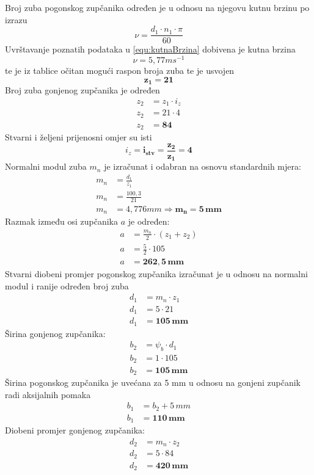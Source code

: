 \documentclass[11pt,a4paper]{report}
\begin{document}
Broj zuba pogonskog zupčanika određen je u odnosu na njegovu kutnu brzinu po izrazu
\begin{equation}
\nu=\frac{d_1 \cdot n_1 \cdot \pi}{60}\label{equ:kutnaBrzina}
\end{equation}
Uvrštavanje poznatih podataka u \eqref{equ:kutnaBrzina} dobivena je kutna brzina
$$\nu=5,77 ms^{-1}$$
te je iz tablice \cite{potrebniMaterijali} očitan mogući raspon broja zuba te je usvojen 
$$\mathbf{z_1=21}$$
Broj zuba gonjenog zupčanika je određen
\begin{align*}
z_2&=z_1 \cdot i_z\\
z_2&=21 \cdot 4\\
z_2&=\mathbf{84}
\end{align*}
Stvarni i željeni prijenosni omjer su isti $$i_z=\mathbf{i_{stv}=\frac{z_2}{z_1}=4}$$
Normalni modul zuba $m_n$ je izračunat i odabran na osnovu standardnih mjera:
\begin{align*}
m_n&=\frac{d_1}{z_1}\\
m_n&=\frac{100,3}{21}\\
m_n&=4,776 mm \Rightarrow \mathbf{m_n=5\, mm}
\end{align*}
Razmak između osi zupčanika $a$ je određen:
\begin{align*}
a&=\frac{m_n}{2} \cdot (z_1 + z_2)\\
a&=\frac{5}{2} \cdot 105\\
a&=\mathbf{262,5\,mm}
\end{align*}
Stvarni diobeni promjer pogonskog zupčanika izračunat je u odnosu na normalni modul i ranije određen broj zuba
\begin{align*}
d_1&=m_n \cdot z_1\\
d_1&=5 \cdot 21\\
d_1&=\mathbf{105 \, mm}
\end{align*}
Širina gonjenog zupčanika:
\begin{align*}
b_2&=\psi_b \cdot d_1\\
b_2&=1 \cdot 105\\
b_2&=\mathbf{105 \,mm}
\end{align*}
Širina pogonskog zupčanika je uvećana za 5 mm u odnosu na gonjeni zupčanik radi aksijalnih pomaka
\begin{align*}
b_1&=b_2+5\,mm\\
b_1&=\mathbf{110 \,mm}
\end{align*}
Diobeni promjer gonjenog zupčanika:
\begin{align*}
d_2&=m_n \cdot z_2\\
d_2&=5 \cdot 84\\
d_2&=\mathbf{420 \,mm}
\end{align*}
\end{document}
